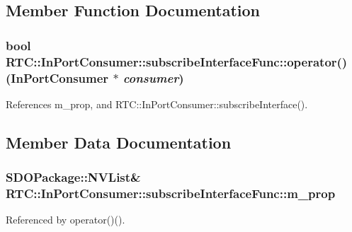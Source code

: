 \subsection{Member Function Documentation}
\subsubsection[{operator()}]{\setlength{\rightskip}{0pt plus 5cm}bool RTC::InPortConsumer::subscribeInterfaceFunc::operator() ({\bf InPortConsumer} $\ast$ {\em consumer})\hspace{0.3cm}{\ttfamily  [inline]}}\label{structRTC_1_1InPortConsumer_1_1subscribeInterfaceFunc_a8efd90a82478a23c28eab2f38fcfef00}


References m\_\-prop, and RTC::InPortConsumer::subscribeInterface().



\subsection{Member Data Documentation}
\subsubsection[{m\_\-prop}]{\setlength{\rightskip}{0pt plus 5cm}SDOPackage::NVList\& {\bf RTC::InPortConsumer::subscribeInterfaceFunc::m\_\-prop}}\label{structRTC_1_1InPortConsumer_1_1subscribeInterfaceFunc_a2dbf7db0dab3e68f117ce407fcb5a0eb}


Referenced by operator()().

